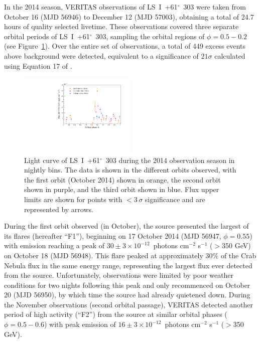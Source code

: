\documentclass[preprint2]{aastex}
\newcommand{\pflux}{~photons cm$^{-2}$ s$^{-1}$}
\newcommand{\lsi}{LS~I~+61$^{\circ}$~303}
\begin{document}
In the 2014 season, VERITAS observations of \lsi{} were taken from October 16 (MJD 56946) to  December 12 (MJD 57003), obtaining a total of 24.7 hours of quality selected livetime. These observations covered three separate orbital periods of \lsi{}, sampling the orbital regions of $\phi = 0.5-0.2$ (see Figure~\ref{f:fig1}). Over the entire set of observations, a total of 449 excess events above background were detected, equivalent to a significance of $21\sigma$ calculated using Equation 17 of \citet{LiMa}.

\begin{figure}[ht]
\centering
\includegraphics[width=0.5\textwidth]{./figs/fluxvphase.pdf}
\caption{Light curve of \lsi{} during the 2014 observation season in nightly bins. %
The data is shown in the different orbits observed, with the first orbit (October 2014) shown in orange, the second orbit shown in purple, and the third orbit shown in blue. Flux upper limits are shown for points with $<3\,\sigma$ significance and are represented by arrows.
}
\label{f:fig1}
\end{figure}

During the first orbit observed (in October), the source presented the largest of its flares (hereafter ``F1''), beginning on 17 October 2014 (MJD 56947, $\phi = 0.55$) with emission reaching a peak of $30 \pm 3 \times10^{-12}$\pflux{} ($>$350 GeV) on October 18 (MJD 56948). This flare peaked at approximately $30\%$ of the Crab Nebula flux in the same energy range, representing the largest flux ever detected from the source. Unfortunately, observations were limited by poor weather conditions for two nights following this peak and only recommenced on October 20 (MJD 56950), by which time the source had already quietened down. During the November observations (second orbital passage), VERITAS detected another period of high activity (``F2'') from the source at similar orbital phases ($\phi = 0.5-0.6$) with peak emission of $16 \pm 3 \times10^{-12}$\pflux{} ($>$350 GeV).
\end{document}
